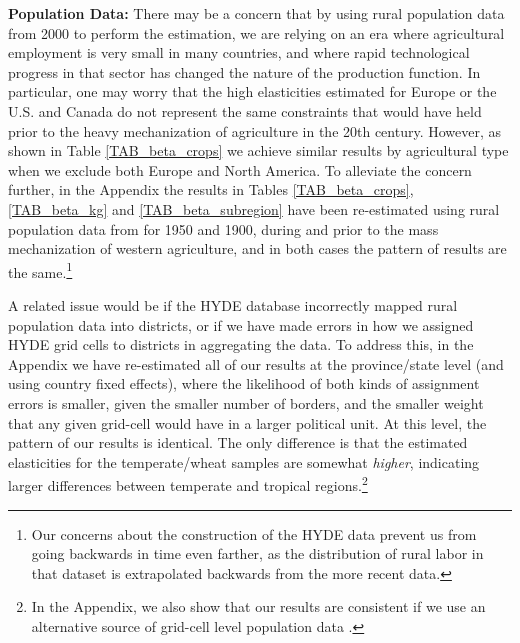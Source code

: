 \documentclass[11pt]{article}
\begin{document}
\vspace{.5cm}\noindent\textbf{Population Data:} There may be a concern that by using rural population data from 2000 to perform the estimation, we are relying on an era where agricultural employment is very small in many countries, and where rapid technological progress in that sector has changed the nature of the production function. In particular, one may worry that the high elasticities estimated for Europe or the U.S. and Canada do not represent the same constraints that would have held prior to the heavy mechanization of agriculture in the 20th century. However, as shown in Table \ref{TAB_beta_crops} we achieve similar results by agricultural type when we exclude both Europe and North America. To alleviate the concern further, in the Appendix the results in Tables \ref{TAB_beta_crops}, \ref{TAB_beta_kg} and \ref{TAB_beta_subregion} have been re-estimated using rural population data from \citet{hyde31} for 1950 and 1900, during and prior to the mass mechanization of western agriculture, and in both cases the pattern of results are the same.\footnote{Our concerns about the construction of the HYDE data prevent us from going backwards in time even farther, as the distribution of rural labor in that dataset is extrapolated backwards from the more recent data.}

A related issue would be if the HYDE database incorrectly mapped rural population data into districts, or if we have made errors in how we assigned HYDE grid cells to districts in aggregating the data. To address this, in the Appendix we have re-estimated all of our results at the province/state level (and using country fixed effects), where the likelihood of both kinds of assignment errors is smaller, given the smaller number of borders, and the smaller weight that any given grid-cell would have in a larger political unit. At this level, the pattern of our results is identical. The only difference is that the estimated elasticities for the temperate/wheat samples are somewhat \textit{higher}, indicating larger differences between temperate and tropical regions.\footnote{In the Appendix, we also show that our results are consistent if we use an alternative source of grid-cell level population data \citep{grump2011}.}
\end{document}
